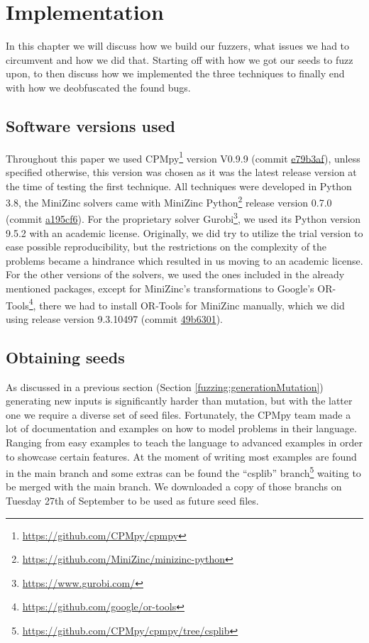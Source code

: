\chapter{Implementation}
\label{cha:5:impl}
\label{impl:Intro}
In this chapter we will discuss how we build our fuzzers, what issues we had to circumvent and how we did that. Starting off with how we got our seeds to fuzz upon, to then discuss how we implemented the three techniques to finally end with how we deobfuscated the found bugs.

\section{Software versions used}
\label{impl:softwareVersion}
Throughout this paper we used CPMpy\footnote{\url{https://github.com/CPMpy/cpmpy}} version V0.9.9 (commit \href{https://github.com/CPMpy/cpmpy/commit/e79b3afedc934a9437c2ddb3a9f54d7e2d7bd3ee}{e79b3af}), unless specified otherwise, this version was chosen as it was the latest release version at the time of testing the first technique. All techniques were developed in Python 3.8, the MiniZinc solvers came with MiniZinc Python\footnote{\url{https://github.com/MiniZinc/minizinc-python}} release version 0.7.0 (commit \href{https://github.com/MiniZinc/minizinc-python/commit/a195cf63fcfbc98665d70ab64efb5424db25bd7e}{a195cf6}). For the proprietary solver Gurobi\footnote{\url{https://www.gurobi.com/}}, we used its Python version 9.5.2 with an academic license. 
Originally, we did try to utilize the trial version to ease possible reproducibility, but the restrictions on the complexity of the problems became a hindrance which resulted in us moving to an academic license. For the other versions of the solvers, we used the ones included in the already mentioned packages, except for MiniZinc’s transformations to Google’s OR-Tools\footnote{\url{https://github.com/google/or-tools}}, there we had to install OR-Tools for MiniZinc manually, which we did using release version 9.3.10497 (commit \href{https://github.com/google/or-tools/commit/49b6301e1e1e231d654d79b6032e79809868a70e}{49b6301}).


\section{Obtaining seeds}
\label{impl:obtainingSeeds}
As discussed in a previous section (Section \ref{fuzzing:generationMutation}) generating new inputs is significantly harder than mutation, but with the latter one we require a diverse set of seed files. Fortunately, the CPMpy team made a lot of documentation and examples on how to model problems in their language. Ranging from easy examples to teach the language to advanced examples in order to showcase certain features. 
At the moment of writing most examples are found in the main branch and some extras can be found the “csplib” branch\footnote{\url{https://github.com/CPMpy/cpmpy/tree/csplib}} waiting to be merged with the main branch. We downloaded a copy of those branchs on Tuesday 27th of September to be used as future seed files. 

